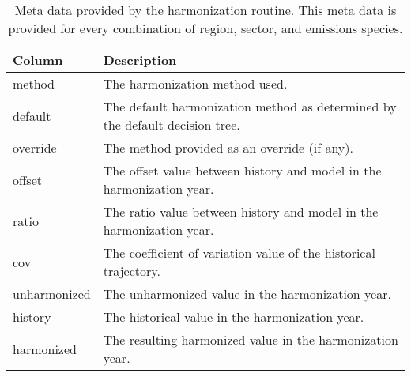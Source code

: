 \begin{table}[]
\centering
\caption{Meta data provided by the  harmonization routine. This meta data is provided for every combination of region, sector, and emissions species.}
\label{tab:metadata}
\begin{tabular}{|p{2cm}|p{8cm}|}
\hline
\textbf{Column}       & \textbf{Description}                                      \\
\hline
\hline
method       & The harmonization method used.                                               \\
\hline
default      & The default harmonization method as determined by the default decision tree. \\
\hline
override     & The method provided as an override (if any).                                 \\
\hline
offset       & The offset value between history and model in the harmonization year.        \\
\hline
ratio        & The ratio value between history and model in the harmonization year.         \\
\hline
cov          & The coefficient of variation value of the historical trajectory.                           \\
\hline
unharmonized & The unharmonized value in the harmonization year.                            \\
\hline
history      & The historical value in the harmonization year.                             \\
\hline
harmonized   & The resulting harmonized value in the harmonization year.\\
\hline
\end{tabular}
\end{table}
